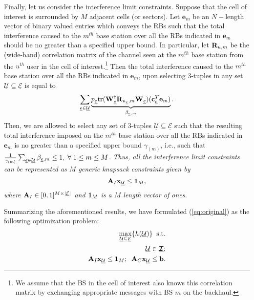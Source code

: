 \documentclass[11pt] {article}
\newcommand{\uwti}[1]{{\mathbf #1}}
\newcommand{\bb}{{\uwti b}}  \newcommand{\Bb}{{\uwti B}}
\newcommand{\cb}{{\uwti c}}  \newcommand{\Cb}{{\uwti C}}
\newcommand{\eb}{{\uwti e}}  \newcommand{\Eb}{{\uwti E}}
\newcommand{\xb}{{\uwti x}}  \newcommand{\Xb}{{\uwti X}}
\newcommand{\Iulk} {{\underline{{\bm {\mathcal I}}}}}
\newcommand{\Uulc} {{\underline{\mathcal U}}}
\newcommand{\Eulc} {{\underline{\mathcal E}}}
\begin{document}
 Finally, let us consider the interference limit constraints. Suppose that the cell of interest is surrounded by $M$ adjacent cells (or sectors). Let $\eb_m$ be an $N-$length vector of binary valued entries which conveys the RBs such that the total interference caused to the $m^{th}$ base station over all the RBs indicated in $\eb_m$ should be no greater than a specified upper bound. In particular,
  let $\Rb_{u,m}$ be the (wide-band) correlation matrix of the channel seen at the $m^{th}$ base station from the $u^{th}$ user in the cell of interest.\footnote{We assume that the BS in the cell of interest also knows this correlation matrix by exchanging appropriate messages with BS $m$ on the backhaul.} Then the total interference caused to the $m^{th}$ base station over all the RBs indicated in $\eb_m$, upon selecting 3-tuples in any set $\Uulc\subseteq \Eulc$ is equal to
   \begin{eqnarray}\label{eq:interf}
  \sum_{\eul\in\Uulc}\underbrace{p_{\eul}\tr(\Wb_{\eul}^{\dag}\Rb_{u_{\eul},m}\Wb_{\eul})(\cb_{\eul}^T\eb_m)}_{\beta_{\eul,m}}.
 \end{eqnarray}
  Then, we are allowed to select   any set of 3-tuples $\Uulc\subseteq \Eulc$ such that the resulting total interference imposed on the $m^{th}$ base station over all the RBs indicated in $\eb_m$ is
  no greater than a specified upper bound $\gamma_{(m)}$, i.e., such that $\frac{1}{\gamma_{(m)}}\sum_{\eul\in\Uulc}\beta_{\eul,m}\leq 1,\;\forall\; 1\leq m\leq M$.
{\em Thus, all the interference limit constraints can be represented as $M$ generic knapsack constraints
 given by
 \begin{eqnarray}
 \Ab_I\xb_{\Uulc}\leq {\bf 1}_M,
 \end{eqnarray}
 where $\Ab_I\in [0,1]^{M\times |\Eulc|}$ and $ {\bf 1}_M$ is a $M$ length vector of ones.}










Summarizing the aforementioned results, we have formulated (\ref{eq:original})  as the following optimization problem:
 \begin{eqnarray}\label{eq:original2}
\nonumber  \max_{\Uulc\subseteq\Eulc} \{h(\Uulc)\}\;\; {\rm s.t.}\\
 \nonumber\Uulc\in\Iulk;\\
  \Ab_I\xb_{\Uulc}\leq {\bf 1}_M;\;\;\Ab_C\xb_{\Uulc}\leq \bb.
 \end{eqnarray}
\end{document}
